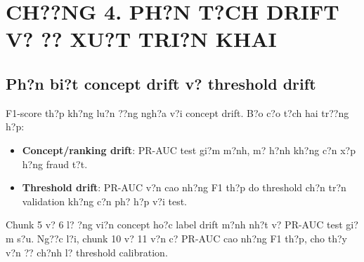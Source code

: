 \cleardoublepage
\section*{CH??NG 4. PH?N T?CH DRIFT V? ?? XU?T TRI?N KHAI}
\setcounter{section}{4}
\setcounter{subsection}{0}
\setcounter{figure}{0}
\setcounter{table}{0}

\subsection{Ph?n bi?t concept drift v? threshold drift}

F1-score th?p kh?ng lu?n ??ng ngh?a v?i concept drift. B?o c?o t?ch hai tr??ng h?p:
\begin{itemize}
    \item \textbf{Concept/ranking drift}: PR-AUC test gi?m m?nh, m? h?nh kh?ng c?n x?p h?ng fraud t?t.
    \item \textbf{Threshold drift}: PR-AUC v?n cao nh?ng F1 th?p do threshold ch?n tr?n validation kh?ng c?n ph? h?p v?i test.
\end{itemize}

\begin{table}[H]
\centering
\caption{Ch?n ?o?n c?c chunk c? F1 th?p v?i \texttt{xgb\_class\_weight}}
\end{table}

Chunk 5 v? 6 l? ?ng vi?n concept ho?c label drift m?nh nh?t v? PR-AUC test gi?m s?u. Ng??c l?i, chunk 10 v? 11 v?n c? PR-AUC cao nh?ng F1 th?p, cho th?y v?n ?? ch?nh l? threshold calibration.

